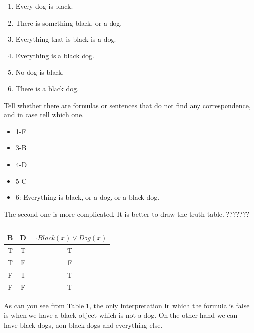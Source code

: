 \documentclass[10pt,a4paper]{article}
\begin{document}
\begin{enumerate}[label=\Alph*]
\item Every dog is black.
\item There is something black, or a dog. 
\item Everything that is black is a dog. 
\item Everything is a black dog.
\item No dog is black.
\item There is a black dog.
\end{enumerate}
 
Tell whether there are formulas or sentences that do not find any correspondence, and in case tell which one.

\begin{itemize}
\item 1-F
\item 3-B
\item 4-D
\item 5-C
\item 6: Everything is black, or a dog, or a black dog.
\end{itemize}
The second one is more complicated. It is better to draw the truth table. ???????

\begin{table}[H]
\centering
    \begin{tabular}{|c|c|c|}
        \hline
        B & D & $\neg Black(x) \vee Dog(x)$ \\ \hline
        T & T & T                         \\  \hline
        T & F & F                         \\  \hline
        F & T & T                         \\  \hline
        F & F & T                         \\
        \hline
    \end{tabular}
    \caption{}
\label{tab:ex2sub2}
\end{table}

As can you see from Table \ref{tab:ex2sub2}, the only interpretation in which the formula is false is when we have a black object which is not a dog. On the other hand we can have black  dogs, non black dogs and everything else. 
\end{document}
